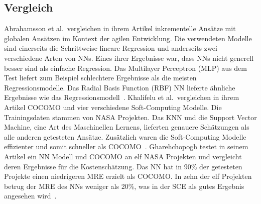 \subsection{Vergleich}
Abrahamsson et al.~vergleichen in ihrem Artikel inkrementelle Ansätze mit globalen Ansätzen im Kontext der agilen Entwicklung. Die verwendeten Modelle sind einerseits die Schrittweise lineare Regression und anderseits zwei verschiedene Arten von NNs. Eines ihrer Ergebnisse war, dass NNs nicht generell besser sind als einfache Regression. Das Multilayer Perceptron (MLP) aus dem Test liefert zum Beispiel schlechtere Ergebnisse als die meisten Regressionsmodelle. Das Radial Basis Function (RBF) NN lieferte ähnliche Ergebnisse wie das Regressionsmodell~\cite{Abrahamsson2007}.
Khalifelu et al.~vergleichen in ihrem Artikel COCOMO und vier verschiedene Soft-Computing Modelle. Die Trainingsdaten stammen von NASA Projekten. Das KNN und die Support Vector Machine, eine Art des Maschinellen Lernens, lieferten genauere Schätzungen als alle anderen getesteten Ansätze. Zusätzlich waren die Soft-Computing Modelle effizienter und somit schneller als COCOMO~\cite{Khalifelu2012}.
Gharehchopogh testet in seinem Artikel ein NN Modell und COCOMO an elf NASA Projekten und vergleicht deren Ergebnisse für die Kostenschätzung. Das NN hat in 90\% der getesteten Projekte einen niedrigeren MRE erzielt als COCOMO. In zehn der elf Projekten betrug der MRE des NNs weniger als 20\%, was in der SCE als gutes Ergebnis angesehen wird~\cite{Gharehchopogh2011}\cite{Abrahamsson2007}.